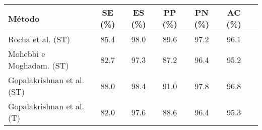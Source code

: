 \begin{tabular}{lcccccc}
    \toprule
    Método & SE (\%) & ES (\%) & PP (\%) & PN (\%) & AC (\%)\\
    \midrule
    Rocha et al. (ST)          & 85.4 & 98.0 & 89.6 & 97.2 & 96.1\\
    Mohebbi e Moghadam. (ST)   & 82.7 & 97.3 & 87.2 & 96.4 & 95.2\\
    \rowcolor[gray]{0.9}
    Gopalakrishnan et al. (ST) & 88.0 & 98.4 & 91.0 & 97.8 & 96.8\\
    Gopalakrishnan et al. (T)  & 82.0 & 97.6 & 88.6 & 96.4 & 95.3\\
    \bottomrule
\end{tabular}

